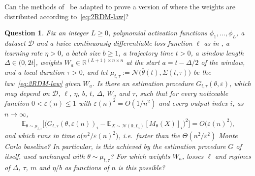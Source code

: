 \documentclass[11pt]{article}
\newtheorem{question}{Question}
\theoremstyle{remark}
\begin{document}
Can the methods of~\cite{MSP-ARC} be adapted to prove a version of  where the weights are distributed according to~\eqref{eq:2RDM-law}?
\begin{question}\label{q:msp-2RDM}
Fix an integer $L \geq 0$, polynomial activation functions $\phi_1, \dots, \phi_L$, a dataset $\mathcal{D}$ and a twice continuously differentiable loss function $\ell$ as in , a learning rate $\eta > 0$, a batch size $b \geq 1$, a trajectory time $t > 0$, a window length $\Delta \in (0, 2t]$, weights $W_a \in \mathbb{R}^{(L+1) \times n \times n}$ at the start $a = t - \Delta/2$ of the window, and a local duration $\tau > 0$, and let $\mu_{t, \tau} := \mathcal{N}\big(\bar\theta(t), \Sigma(t, \tau)\big)$ be the law~\eqref{eq:2RDM-law} given $W_a$. Is there an estimation procedure $G_{t, \tau}(\theta, \varepsilon)$, which may depend on $\mathcal{D}$, $\ell$, $\eta$, $b$, $t$, $\Delta$, $W_a$ and $\tau$, such that for every noticeable function $0 < \varepsilon(n) \leq 1$ with $\varepsilon(n)^2 = O(1/n^2)$ and every output index $i$, as $n \to \infty$,
\[
    \mathbb{E}_{\theta \sim \mu_{t, \tau}}\Big[ \big( G_{t, \tau}(\theta, \varepsilon(n))_i - \mathbb{E}_{X \sim \mathcal{N}(0, I_n)}[M_\theta(X)]_i \big)^2 \Big] = O\big(\varepsilon(n)^2\big),
\]
and which runs in time $o\big(n^2/\varepsilon(n)^2\big)$, i.e.\ faster than the $\Theta(n^2/\varepsilon^2)$ Monte Carlo baseline? In particular, is this achieved by the estimation procedure $G$ of  itself, used unchanged with $\theta \sim \mu_{t, \tau}$? For which weights $W_a$, losses $\ell$ and regimes of $\Delta$, $\tau$, $m$ and $\eta/b$ as functions of $n$ is this possible?
\end{question}
\end{document}
